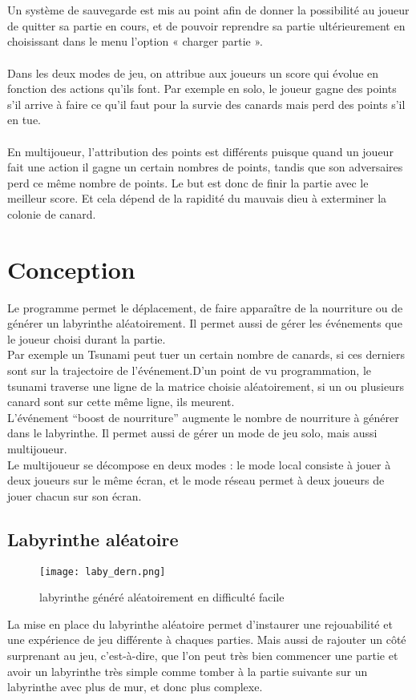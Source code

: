 ﻿\documentclass[12pt,a4paper,twoside]{article}
\begin{document}
\\ \\
Un système de sauvegarde est mis au point afin de donner la possibilité au joueur de quitter sa partie en cours, et de pouvoir reprendre sa partie ultérieurement en choisissant dans le menu l'option « charger partie ».
\\ \\
Dans les deux modes de jeu, on attribue aux joueurs un score qui évolue en fonction des actions qu’ils font.
Par exemple en solo, le joueur gagne des points s’il arrive à faire ce qu'il faut pour la survie des canards mais perd des points s’il en tue.
\\ \\
En multijoueur, l’attribution des points est différents puisque quand un joueur fait une action il gagne un certain nombres de points, tandis que son adversaires perd ce même nombre de points. Le but est donc de finir la partie avec le meilleur score. Et cela dépend de la rapidité du mauvais dieu à exterminer la colonie de canard.
\newpage
\section{Conception}
Le programme permet le déplacement, de faire apparaître de la nourriture ou de générer un labyrinthe aléatoirement. Il permet aussi de gérer les événements que le joueur choisi durant la partie. 
\\Par exemple un Tsunami peut tuer un certain nombre de canards, si ces derniers sont sur la trajectoire de l'événement.D’un point de vu programmation, le tsunami traverse une ligne de la matrice choisie aléatoirement, si un ou plusieurs canard sont sur cette même ligne, ils meurent.
\\L'événement “boost de nourriture” augmente le nombre de nourriture à générer dans le labyrinthe.
Il permet aussi de gérer un mode de jeu solo, mais aussi multijoueur.
\\Le multijoueur se décompose en deux modes : le mode local consiste à jouer à deux joueurs sur le même écran, et le mode réseau permet à deux joueurs de jouer chacun sur son écran.
\subsection{Labyrinthe aléatoire}
\begin{figure}[h]
\centering
\texttt{[image: laby\_dern.png]}
\caption{labyrinthe généré aléatoirement en difficulté facile}
\end{figure}
\newpage
La mise en place du labyrinthe aléatoire permet d'instaurer une rejouabilité et une expérience de jeu différente à chaques parties. Mais aussi de rajouter un côté surprenant au jeu, c'est-à-dire, que l'on peut très bien commencer une partie et avoir un labyrinthe très simple comme tomber à la partie suivante sur un labyrinthe avec plus de mur, et donc plus complexe.
\end{document}
